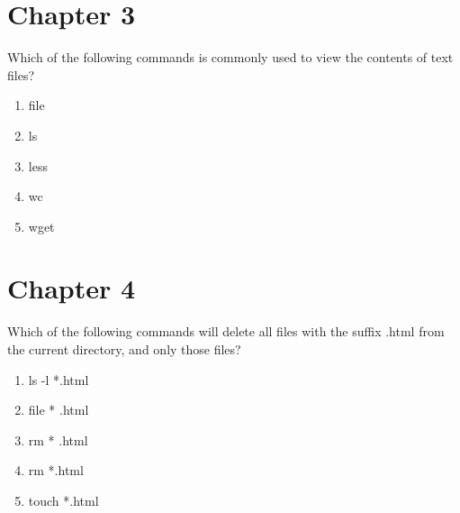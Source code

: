 \documentclass{beamer}
\begin{document}
\section{Chapter 3}

\begin{frame}[fragile]

Which of the following commands is commonly used to view the contents of text files?

\begin{enumerate}[label=\Alph*)]

\item file

\item ls

\item less

\item wc

\item wget

\end{enumerate}

\end{frame}


\section{Chapter 4}

\begin{frame}[fragile]

Which of the following commands will delete all files with the suffix .html from the current directory, and only those files?

\begin{enumerate}[label=\Alph*)]

\item ls -l *.html

\item file * .html

\item rm * .html

\item rm *.html

\item touch *.html

\end{enumerate}

\end{frame}
\end{document}
